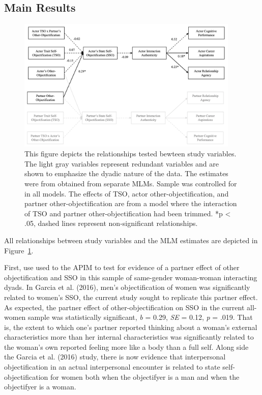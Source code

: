\documentclass[man]{apa6}
\begin{document}
\subsection{Main Results}\label{main-results}

\begin{figure}
\includegraphics[width=400px]{figures/SEMfigure} \caption{This figure depicts the relationships tested bewteen study variables. The light gray variables represent redundant variables and are shown to emphasize the dyadic nature of the data. The estimates were from obtained from separate MLMs. Sample was controlled for in all models. The effects of TSO, actor other-objectification, and partner other-objectification are from a model where the interaction of TSO and partner other-objectification had been trimmed. *p < .05, dashed lines represent non-significant relationships.}\label{fig:semfigure}
\end{figure}

All relationships between study variables and the MLM estimates are
depicted in Figure~\ref{fig:semfigure}.

First, use used to the APIM to test for evidence of a partner effect of
other objectification and SSO in this sample of same-gender woman-woman
interacting dyads. In Garcia et al. (2016), men's objectification of
women was significantly related to women's SSO, the current study sought
to replicate this partner effect. As expected, the partner effect of
other-objectification on SSO in the current all-women sample was
statistically significant, \emph{b} = 0.29, \emph{SE} = 0.12, \emph{p} =
.019. That is, the extent to which one's partner reported thinking about
a woman's external characteristics more than her internal
characteristics was significantly related to the woman's own reported
feeling more like a body than a full self. Along side the Garcia et al.
(2016) study, there is now evidence that interpersonal objectification
in an actual interpersonal encounter is related to state
self-objectification for women both when the objectifyer is a man and
when the objectifyer is a woman.
\end{document}

